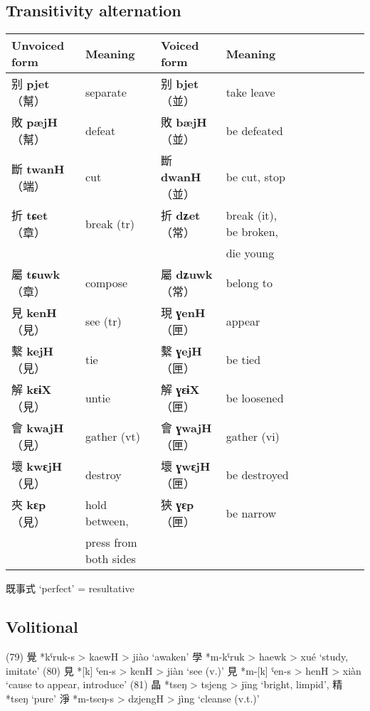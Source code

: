 \documentclass[oneside,a4paper,11pt]{article}
\newcommand{\ipa}[1]{\textbf{{\phon\mbox{#1}}}} %
\newcommand{\zh}[1]{{\cn #1}}
\newcommand{\zhc}[2]{\zh{#1} \ipa{#2}}
\newcommand{\mc}[1]{\zh{（#1）}}
\begin{document}
 
 \subsection{Transitivity alternation}
\begin{table}[H]
\begin{tabular}{llllllllll}
\toprule
Unvoiced form &Meaning & Voiced form & Meaning\\
\midrule
\zhc{别}{pjet} \mc{幫}	&separate & \zhc{别}{bjet} \mc{並} & take leave \\
\zhc{敗}{pæjH} \mc{幫}	&defeat & \zhc{敗}{bæjH} \mc{並} & be defeated \\
\midrule
\zhc{斷}{twanH} \mc{端}	&cut & \zhc{斷}{dwanH} \mc{並} & be cut, stop \\
\midrule
\zhc{折}{tɕet} \mc{章}	&break (tr) & \zhc{折}{dʑet} \mc{常} &break (it), be broken, \\
&&&die young \\
\zhc{屬}{tɕuwk} \mc{章}	&compose & \zhc{屬}{dʑuwk} \mc{常} &belong to \\
\midrule 
\zhc{見}{kenH} \mc{見}	&see (tr) & \zhc{現}{ɣenH} \mc{匣} & appear \\
\zhc{繫}{kejH} \mc{見}	&tie & \zhc{繫}{ɣejH} \mc{匣} & be tied \\
\zhc{解}{kɛɨX} \mc{見}	&untie & \zhc{解}{ɣɛɨX} \mc{匣} & be loosened \\
\zhc{會}{kwajH} \mc{見}	&gather (vt) & \zhc{會}{ɣwajH} \mc{匣} & gather (vi) \\
\zhc{壞}{kwɛjH} \mc{見}	&destroy  & \zhc{壞}{ɣwɛjH} \mc{匣} & be destroyed \\
\zhc{夾}{kɛp} \mc{見}	&hold between,   & \zhc{狹}{ɣɛp} \mc{匣} & be narrow \\
&press from both sides&&\\
\bottomrule
\end{tabular}
\end{table}
\citet{downer73loanwords, sagart03prenasalized}

\zh{既事式}  `perfect' = resultative  \citet[86]{zhou62goucibian}


\subsection{Volitional}
(79) 覺 *kˤruk-s > kaewH > jiào ‘awaken’
學 *m-kˤruk > haewk > xué ‘study, imitate’
(80) 見 *[k] ˤen-s > kenH > jiàn ‘see (v.)’
見 *m-[k] ˤen-s > henH > xiàn ‘cause to appear, introduce’
(81) 晶 *tseŋ > tsjeng > jīng ‘bright, limpid’, 精 *tseŋ ‘pure’
淨 *m-tseŋ-s > dzjengH > jìng ‘cleanse (v.t.)’
\end{document}
